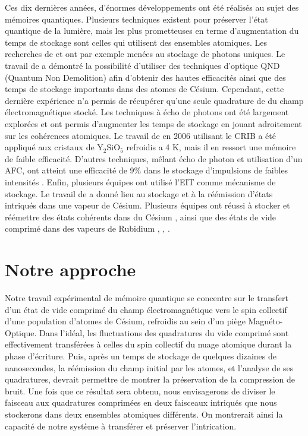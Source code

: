  
Ces dix derni\`eres ann\'ees, d'\'enormes d\'eveloppements ont \'et\'e r\'ealis\'es au sujet des m\'emoires quantiques. Plusieurs techniques existent pour pr\'eserver l'\'etat quantique de la lumi\`ere, mais les plus prometteuses en terme d'augmentation du temps de stockage sont celles qui utilisent des ensembles atomiques.  Les recherches de \cite{Kuzmich05} et \cite{Lukin05} ont par exemple men\'ees au stockage de photons uniques. Le travail de \cite{Polzik04} a d\'emontr\'e la possibilit\'e d'utiliser des techniques d'optique QND (Quantum Non Demolition) afin d'obtenir des hautes efficacit\'es ainsi que des temps de stockage importants dans des atomes de C\'esium. Cependant, cette derni\`ere exp\'erience n'a permis de r\'ecup\'erer qu'une seule quadrature de du champ \'electromagn\'etique stock\'e.  Les techniques \`a \'echo de photons ont \'et\'e largement explor\'ees et ont permis d'augmenter les temps de stockage en jouant adroitement sur les coh\'erences atomiques. Le travail de \cite{PhysRevLett.96.043602} en 2006 utilisant le CRIB a \'et\'e appliqu\'e aux cristaux de Y$_2$SiO$_5$ refroidis a 4 K, mais il en ressort une m\'emoire de faible efficacit\'e.  D'autres techniques, m\^elant \'echo de photon et utilisation d'un AFC, ont atteint une efficacit\'e de 9\% dans le stockage d'impulsions de faibles intensit\'es  \cite{chaneliere2010efficient}. Enfin, plusieurs \'equipes ont utilis\'e l'EIT comme m\'ecanisme de stockage.  Le travail de \cite{choi2008mapping} a donn\'e lieu au stockage et \`a la r\'e\'emission d'\'etats intriqu\'es dans une vapeur de C\'esium.  Plusieurs \'equipes ont r\'eussi \`a stocker et r\'e\'emettre des \'etats coh\'erents dans du C\'esium  \cite{CviklinskiPhD}, ainsi que des \'etats de vide comprim\'e dans des vapeurs de Rubidium \cite{Lvovsky08}, \cite{Kozuma08}, \cite{Kozuma09}.
 



\section*{Notre approche}

Notre travail exp\'erimental de m\'emoire quantique se concentre sur le transfert d'un \'etat de vide comprim\'e du champ \'electromagn\'etique vers le spin collectif d'une population d'atomes de C\'esium, refroidis au sein d'un pi\`ege Magn\'eto-Optique. Dans l'id\'eal, les fluctuations des quadratures du vide comprim\'e sont effectivement transf\'er\'ees \`a celles du spin collectif du nuage atomique durant la phase d'\'ecriture. Puis, apr\`es un temps de stockage de quelques dizaines de nanosecondes, la r\'e\'emission du champ initial par les atomes, et l'analyse de ses quadratures, devrait permettre de montrer la pr\'eservation de la compression de bruit. Une fois que ce r\'esultat sera obtenu, nous envisagerons de diviser le faisceau aux quadratures comprim\'ees en deux faisceaux intriqu\'es que nous stockerons dans deux ensembles atomiques diff\'erents. On montrerait ainsi la capacit\'e de notre syst\`eme \`a transf\'erer et pr\'eserver l'intrication. 

